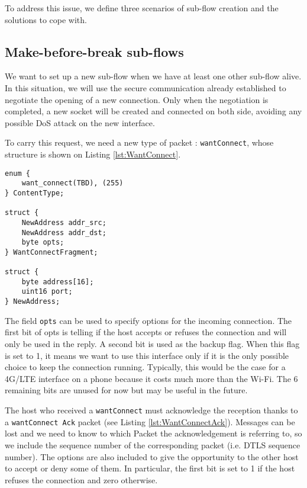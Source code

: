 To address this issue, we define three scenarios of sub-flow creation and the solutions to cope with.

\subsection{Make-before-break sub-flows}
\label{sec:mbf}

We want to set up a new sub-flow when we have at least one other sub-flow alive. In this situation, we will use the secure communication already established to negotiate the opening of a new connection. Only when the negotiation is completed, a new socket will be created and connected on both side, avoiding any possible DoS attack on the new interface.

To carry this request, we need a new type of packet : \texttt{wantConnect}, whose structure is shown on Listing \ref{lst:WantConnect}.

\begin{lstlisting}[caption= WantConnect message, label=lst:WantConnect]
enum {
    want_connect(TBD), (255)
} ContentType;

struct {
    NewAddress addr_src;
    NewAddress addr_dst;
    byte opts;
} WantConnectFragment;

struct {
    byte address[16];
    uint16 port;
} NewAddress;
\end{lstlisting}

The field \texttt{opts} can be used to specify options for the incoming connection. The first bit of opts is telling if the host accepts or refuses the connection and will only be used in the reply. A second bit is used as the backup flag. When this flag is set to 1, it means we want to use this interface only if it is the only possible choice to keep the connection running. Typically, this would be the case for a 4G/LTE interface on a phone because it costs much more than the Wi-Fi. The 6 remaining bits are unused for now but may be useful in the future.

The host who received a \texttt{wantConnect} must acknowledge the reception thanks to a \texttt{wantConnect Ack} packet (see Listing \ref{lst:WantConnectAck}). Messages can be lost and we need to know to which Packet the acknowledgement is referring to, so we include the sequence number of the corresponding packet (i.e. DTLS sequence number). The options are also included to give the opportunity to the other host to accept or deny some of them. In particular, the first bit is set to 1 if the host refuses the connection and zero otherwise.

